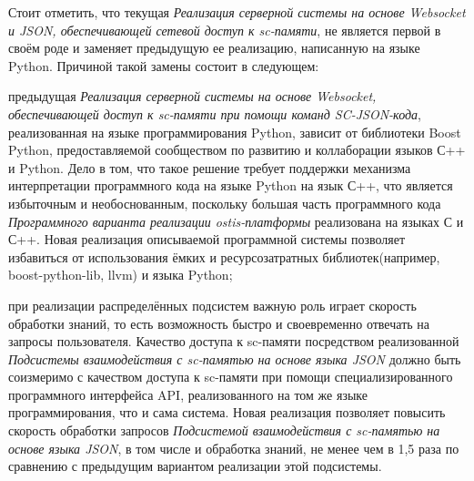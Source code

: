 Стоит отметить, что текущая \textit{Реализация серверной системы на основе Websocket и JSON, обеспечивающей сетевой доступ к sc-памяти}, не является первой в своём роде и заменяет предыдущую ее реализацию, написанную на языке Python.
Причиной такой замены состоит в следующем:
\begin{textitemize}
    \item предыдущая \textit{Реализация серверной системы на основе Websocket, обеспечивающей доступ к sc-памяти при помощи команд SC-JSON-кода}, реализованная на языке программирования Python, зависит от библиотеки Boost Python, предоставляемой сообществом по развитию и коллаборации языков С++ и Python. Дело в том, что такое решение требует поддержки механизма интерпретации программного кода на языке Python на язык С++, что является избыточным и необоснованным, поскольку большая часть программного кода \textit{Программного варианта реализации ostis-платформы} реализована на языках С и С++. Новая реализация описываемой программной системы позволяет избавиться от использования ёмких и ресурсозатратных библиотек(например, boost-python-lib, llvm) и языка Python;
    \item при реализации распределённых подсистем важную роль играет скорость обработки знаний, то есть возможность быстро и своевременно отвечать на запросы пользователя. Качество доступа к sc-памяти посредством реализованной \textit{Подсистемы взаимодействия с sc-памятью на основе языка JSON} должно быть соизмеримо с качеством доступа к sc-памяти при помощи специализированного программного интерфейса API, реализованного на том же языке программирования, что и сама система. Новая реализация позволяет повысить скорость обработки запросов \textit{Подсистемой взаимодействия с sc-памятью на основе языка JSON}, в том числе и обработка знаний, не менее чем в 1,5 раза по сравнению с предыдущим вариантом реализации этой подсистемы.
\end{textitemize}

